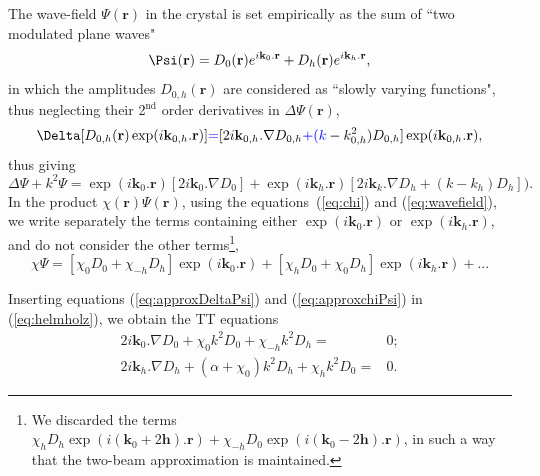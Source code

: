 \documentclass[preprint]{iucr}              %
\newcommand{\inblue}[1]{{\color{blue}#1}}
\begin{document}
The wave-field $\Psi(\textbf{r})$ in the crystal is set empirically as the sum of ``two modulated plane waves"
\begin{equation}
\label{eq:wavefield}
    \Psi(\textbf r) = D_0(\textbf r) e^{i \textbf k_0 . \textbf r} + D_h(\textbf r) e^{i \textbf k_h . \textbf r},
\end{equation}
in which the amplitudes $D_{0,h}(\textbf{r})$ are considered as ``slowly varying functions", thus neglecting their 2$^{\text{nd}}$ order derivatives in $\Delta \Psi(\textbf{r})$,
\begin{equation}
\Delta[D_{0,h}(\textbf{r}) \exp(i\textbf{k}_{0,h} . \textbf{r})] 
\inblue{=}
 [2 i \textbf{k}_{0,h} . \nabla D_{0,h} \inblue{+ (k}- k^2_{0,h} ) D_{0,h}] \exp(i\textbf{k}_{0,h} . \textbf{r}), \nonumber
\end{equation}
\inblue{thus giving
\begin{equation}\label{eq:approxDeltaPsi}
    \Delta\Psi + k^2\Psi= 
    \exp(i \textbf{k}_0.\textbf{r})
    \left[ 2 i \textbf{k}_0 . \nabla D_0 \right] + 
    \exp(i \textbf{k}_h.\textbf{r})
    \left[ 2 i \textbf{k}_k . \nabla D_h + (k-k_h) D_h \right]).
\end{equation}
}
In the product $\chi(\textbf{r}) \Psi(\textbf{r})$, using the equations~(\ref{eq:chi}) and (\ref{eq:wavefield}), we write separately the terms containing either $\exp(i \textbf{k}_0 . \textbf{r})$ or $\exp(i \textbf{k}_h . \textbf{r})$, and do not consider the other terms\footnote{
We discarded the terms $\chi_h D_h \exp(i (\textbf{k}_0+2\textbf{h}) . \textbf{r}) + \chi_{-h} D_0 \exp(i (\textbf{k}_0 - 2 \textbf{h}) .\textbf{r})$,
in such a way that the two-beam approximation is maintained.},
\begin{equation}
\label{eq:approxchiPsi}
\chi\Psi =
[\chi_0 D_0 + \chi_{-h} D_h ] \exp(i \textbf{k}_0 . \textbf{r}) +
[\chi_h D_0 + \chi_0 D_h] \exp(i \textbf{k}_h . \textbf{r})+... 
\end{equation}

Inserting equations (\ref{eq:approxDeltaPsi}) and (\ref{eq:approxchiPsi}) in (\ref{eq:helmholz}), we obtain the TT equations 
\begin{subequations}
\label{eq:TTvectorAlpha}
\begin{align}
2 i \textbf{k}_0 . \nabla D_0 + \chi_0 k^2 D_0 + \chi_{-h} k^2 D_h =& 0; \\
2 i \textbf{k}_h . \nabla D_h + (\alpha + \chi_0) k^2 D_h + \chi_{h} k^2 D_0 =& 0.
\end{align}
\end{subequations}
\end{document}
